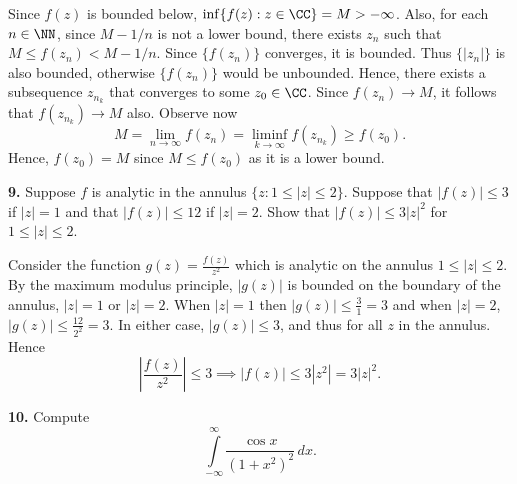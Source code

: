 \documentclass{homework}
\begin{document}
\begin{solution}
  Since $f(z)$ is bounded below, $\inf\{f(z):z\in\CC\} = M > -\infty$.  Also, for each $n\in \NN$, since $M-1/n$ is not a lower bound, there exists $z_n$ such that $M \le f(z_n) < M-1/n.$  Since $\{f(z_n)\}$ converges, it is bounded.  Thus $\{|z_n|\}$ is also bounded, otherwise $\{f(z_n)\}$ would be unbounded.  Hence, there exists a subsequence $z_{n_k}$ that converges to some $z_0 \in \CC$.  Since $f(z_n) \to M$, it follows that $f(z_{n_k}) \to M$ also.  Observe now
  $$
    M = \lim_{n\to\infty} f(z_n) = \liminf_{k\to\infty} f(z_{n_k}) \ge f(z_0).
  $$
  Hence, $f(z_0) = M$ since $M\le f(z_0)$ as it is a lower bound.
\end{solution}

{\bf 9.} Suppose $f$ is analytic in the annulus $\{z:1\le|z|\le 2\}$.  Suppose that $|f(z)| \le 3$ if $|z|=1$ and that $|f(z)| \le 12$ if $|z|=2$.  Show that $|f(z)|\le 3|z|^2$ for $1\le |z|\le 2$.

\begin{solution}
  Consider the function $g(z) = \frac{f(z)}{z^2}$ which is analytic on the
  annulus $1\le |z| \le 2$.  By the maximum modulus principle, $|g(z)|$ is
  bounded on the boundary of the annulus, $|z| = 1$ or $|z| = 2$.  When $|z|=1$
  then $|g(z)| \le \frac 31 = 3$ and when $|z|=2$, $|g(z)| \le \frac {12}{2^2} =
  3.$  In either case, $|g(z)| \le 3$, and thus for all $z$ in the annulus. Hence
  $$
    \left|\frac{f(z)}{z^2}\right| \le 3 \implies |f(z)| \le 3|z^2| = 3|z|^2.
  $$
\end{solution}

{\bf 10.} Compute 
$$
  \int\limits_{-\infty}^\infty \frac{\cos x}{(1+x^2)^2}\,dx.
$$
\end{document}
